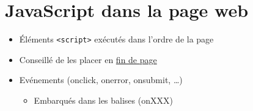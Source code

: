 \begin{english}

\begin{Shaded}
\begin{Highlighting}[]
\NormalTok{()}\OperatorTok{,} \NormalTok{()}\OperatorTok{,} \NormalTok{()}\OperatorTok{,} \NormalTok{()}\OperatorTok{,}
\NormalTok{()}\OperatorTok{,} \NormalTok{()}\OperatorTok{,} \NormalTok{()}\OperatorTok{,} \NormalTok{()}\OperatorTok{,} 
\NormalTok{()}\OperatorTok{,} 
\end{Highlighting}
\end{Shaded}

\end{english}

\hypertarget{javascript-dans-la-page-web}{%
\section{JavaScript dans la page
web}\label{javascript-dans-la-page-web}}

\begin{itemize}
\tightlist
\item
  Éléments \textenglish{\texttt{\textless{}script\textgreater{}}}
  exécutés dans l'ordre de la page
\item
  Conseillé de les placer en
  \href{https://developer.yahoo.com/performance/rules.html\#js_bottom=}{fin
  de page}
\item
  Evénements (onclick, onerror, onsubmit, \ldots)

  \begin{itemize}
  \tightlist
  \item
    Embarqués dans les balises (onXXX)
  \end{itemize}
\end{itemize}

\begin{english}

\begin{Shaded}
\begin{Highlighting}[]
 \KeywordTok{/\textgreater{}}
\end{Highlighting}
\end{Shaded}

\end{english}

